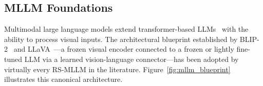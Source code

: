 \subsection{MLLM Foundations}\label{sec2:mllm}

Multimodal large language models extend transformer-based LLMs~\cite{vaswani2017attention}
with the ability to process visual inputs. The architectural blueprint
established by BLIP-2~\cite{blip22023} and LLaVA~\cite{llava2023}---a frozen
visual encoder connected to a frozen or lightly fine-tuned LLM via a learned
vision-language connector---has been adopted by virtually every RS-MLLM in
the literature. Figure~\ref{fig:mllm_blueprint} illustrates this canonical
architecture.

